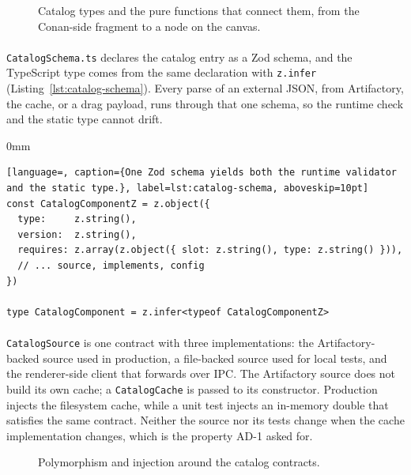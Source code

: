 \begin{figure}[H]
    \centering
    \resizebox{0.96\textwidth}{!}{
        
    }
    \caption[Catalog types and the functions that connect them.]{Catalog types and the pure functions that connect them, from the Conan-side fragment to a node on the canvas.}
    \label{fig:catalog-classes}
\end{figure}

\paragraph{}
\texttt{CatalogSchema.ts} declares the catalog entry as a Zod schema, and the TypeScript type comes from the same declaration with \texttt{z.infer} (Listing~\ref{lst:catalog-schema}). Every parse of an external JSON, from Artifactory, the cache, or a drag payload, runs through that one schema, so the runtime check and the static type cannot drift.

\begin{addmargin}[0mm]{0mm}
\begin{lstlisting}[language=, caption={One Zod schema yields both the runtime validator and the static type.}, label=lst:catalog-schema, aboveskip=10pt]
const CatalogComponentZ = z.object({
  type:     z.string(),
  version:  z.string(),
  requires: z.array(z.object({ slot: z.string(), type: z.string() })),
  // ... source, implements, config
})

type CatalogComponent = z.infer<typeof CatalogComponentZ>
\end{lstlisting}
\end{addmargin}

\paragraph{}
\texttt{CatalogSource} is one contract with three implementations: the Artifactory-backed source used in production, a file-backed source used for local tests, and the renderer-side client that forwards over IPC. The Artifactory source does not build its own cache; a \texttt{CatalogCache} is passed to its constructor. Production injects the filesystem cache, while a unit test injects an in-memory double that satisfies the same contract. Neither the source nor its tests change when the cache implementation changes, which is the property AD-1 asked for.

\begin{figure}[H]
    \centering
    \resizebox{0.95\textwidth}{!}{
        
    }
    \caption[Polymorphism and injection around the catalog contracts.]{Polymorphism and injection around the catalog contracts.}
    \label{fig:catalog-di}
\end{figure}


